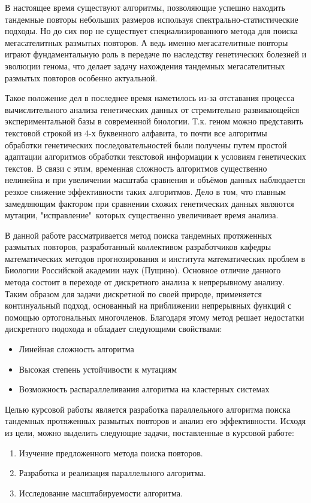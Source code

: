 В настоящее время существуют алгоритмы, позволяющие успешно находить тандемные
повторы небольших размеров используя спектрально-статистические подходы.
Но до сих пор не существует специализированного метода для поиска мегасателитных
размытых повторов. А ведь именно мегасателитные повторы играют фундаментальную
роль в передаче по наследству генетических болезней и эволюции генома, что делает
задачу нахождения тандемных мегасателитных размытых повторов особенно актуальной.

Такое положение дел в последнее время наметилось из-за отставания
процесса вычислительного анализа генетических данных от стремительно развивающейся
экспериментальной базы в современной биологии. Т.к. геном можно представить
текстовой строкой из 4-х буквенного алфавита, то почти все алгоритмы обработки
генетических последовательностей были получены путем простой адаптации алгоритмов
обработки текстовой информации к условиям генетических текстов. В связи с этим,
временная сложность алгоритмов существенно нелинейна и при увеличении масштаба
сравнения и объёмов данных наблюдается резкое снижение эффективности таких
алгоритмов. Дело в том, что главным замедляющим фактором при сравнении схожих
генетических данных являются мутации, "исправление"\ которых существенно
увеличивает время анализа.

В данной работе рассматривается метод поиска тандемных протяженных размытых
повторов, разработанный коллективом разработчиков кафедры математических методов
прогнозирования и института математических проблем в Биологии Российской
академии наук (Пущино). Основное отличие данного метода состоит в переходе
от дискретного анализа к непрерывному анализу. Таким образом для
задачи дискретной по своей природе, применяется континуальный подход, основанный
на приближении непрерывных функций с помощью ортогональных многочленов.
Благодаря этому метод решает недостатки дискретного подохода и обладает
следующими свойствами:
\begin{itemize}
  \item Линейная сложность алгоритма
  \item Высокая степень устойчивости к мутациям
  \item Возможность распараллеливания алгоритма на кластерных системах
\end{itemize}

Целью курсовой работы является разработка параллельного алгоритма поиска
тандемных протяженных размытых повторов и анализ его эффективности. Исходя из
цели, можно выделить следующие задачи, поставленные в курсовой работе:
\begin{enumerate}
  \item Изучение предложенного метода поиска повторов.
  \item Разработка и реализация параллельного алгоритма.
  \item Исследование масштабируемости алгоритма.
\end{enumerate}


\cite{bib1}

\clearpage
